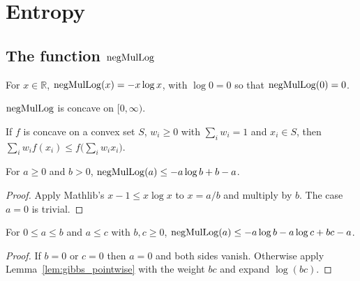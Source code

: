 \chapter{Entropy}
\label{chap:entropy}

\section{The function \texorpdfstring{$\operatorname{negMulLog}$}{negMulLog}}

\begin{definition}
  \label{def:negMulLog}
  \mathlibok
  For $x \in \mathbb R$, $\operatorname{negMulLog}(x) = -x \log x$, with $\log 0 = 0$ so that $\operatorname{negMulLog}(0) = 0$.
\end{definition}

\begin{lemma}[Concavity]
  \label{lem:negMulLog_concave}
  \mathlibok
  $\operatorname{negMulLog}$ is concave on $[0, \infty)$.
\end{lemma}

\begin{lemma}[Jensen]
  \label{lem:jensen}
  \mathlibok
  If $f$ is concave on a convex set $S$, $w_i \ge 0$ with $\sum_i w_i = 1$ and $x_i \in S$, then
  $\sum_i w_i f(x_i) \le f\bigl(\sum_i w_i x_i\bigr)$.
\end{lemma}

\begin{lemma}
  \label{lem:gibbs_pointwise}
  \leanok
  For $a \ge 0$ and $b > 0$, $\operatorname{negMulLog}(a) \le -a \log b + b - a$.
\end{lemma}
\begin{proof}
  \leanok
  Apply Mathlib's $x - 1 \le x \log x$ to $x = a/b$ and multiply by $b$.  The case $a = 0$ is
  trivial.
\end{proof}

\begin{lemma}
  \label{lem:gibbs_product}
  \leanok
  For $0 \le a \le b$ and $a \le c$ with $b, c \ge 0$,
  $\operatorname{negMulLog}(a) \le -a \log b - a \log c + bc - a$.
\end{lemma}
\begin{proof}
  \leanok
  If $b = 0$ or $c = 0$ then $a = 0$ and both sides vanish.  Otherwise apply
  Lemma~\ref{lem:gibbs_pointwise} with the weight $bc$ and expand $\log(bc)$.
\end{proof}

